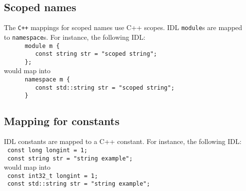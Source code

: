 %
%
%
%
%

\subsection{Scoped names}

The {\tt C++}  mappings for scoped names use C++ scopes.  IDL {\tt module}s are
mapped to {\tt namespace}s. For instance, the following IDL:\hfill\\
\verb|      module m {|\hfill\\
\verb|         const string str = "scoped string";|\hfill\\
\verb|      };|\hfill\\
would map into\hfill\\
\verb|      namespace m {|\hfill\\
\verb|         const std::string str = "scoped string";|\hfill\\
\verb|      }|\hfill\\


\subsection{Mapping for constants}

\GenoM{} IDL constants are mapped to a C++ constant. For instance,
the following IDL:\hfill\\
\verb| const long longint = 1;|\hfill\\
\verb| const string str = "string example";|\hfill\\
would map into\hfill\\
\verb| const int32_t longint = 1;|\hfill\\
\verb| const std::string str = "string example";|\hfill\\


